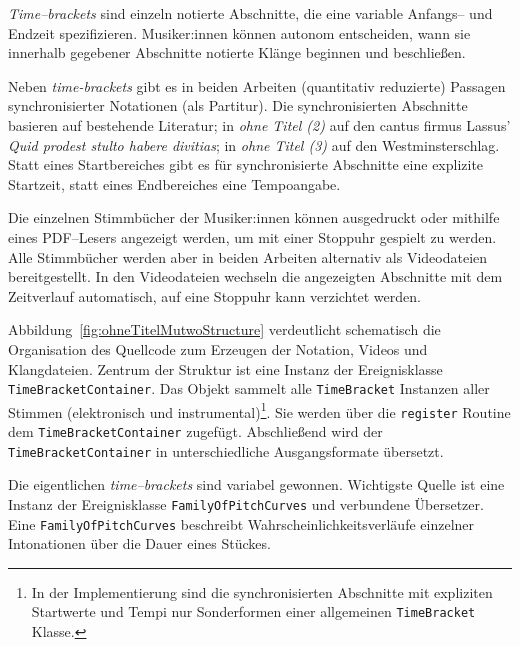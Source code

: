 \documentclass[12pt,a4paper,ngerman]{article}
\begin{document}
\emph{Time--brackets} sind einzeln notierte Abschnitte, die eine variable Anfangs-- und Endzeit spezifizieren.
Musiker:innen können autonom entscheiden, wann sie innerhalb gegebener Abschnitte notierte Klänge beginnen und beschließen.


\bigskip

Neben \emph{time-brackets} gibt es in beiden Arbeiten (quantitativ reduzierte) Passagen synchronisierter Notationen (als Partitur).
Die synchronisierten Abschnitte basieren auf bestehende Literatur; in \emph{ohne Titel (2)} auf den cantus firmus Lassus' \emph{Quid prodest stulto habere divitias}; in \emph{ohne Titel (3)} auf den Westminsterschlag.
Statt eines Startbereiches gibt es für synchronisierte Abschnitte eine explizite Startzeit, statt eines Endbereiches eine Tempoangabe.

\bigskip

Die einzelnen Stimmbücher der Musiker:innen können ausgedruckt oder mithilfe eines PDF--Lesers angezeigt werden, um mit einer Stoppuhr gespielt zu werden.
Alle Stimmbücher werden aber in beiden Arbeiten alternativ als Videodateien bereitgestellt.
In den Videodateien wechseln die angezeigten Abschnitte mit dem Zeitverlauf automatisch, auf eine Stoppuhr kann verzichtet werden.

\bigskip

Abbildung~\ref{fig:ohneTitelMutwoStructure} verdeutlicht schematisch die Organisation des Quellcode zum Erzeugen der Notation, Videos und Klangdateien.
Zentrum der Struktur ist eine Instanz der Ereignisklasse \texttt{TimeBracketContainer}.
Das Objekt sammelt alle \texttt{TimeBracket} Instanzen aller Stimmen (elektronisch und instrumental)\footnote{%
    In der Implementierung sind die synchronisierten Abschnitte mit expliziten Startwerte und Tempi nur Sonderformen einer allgemeinen \texttt{TimeBracket} Klasse.
}.
Sie werden über die \texttt{register} Routine dem \texttt{TimeBracketContainer} zugefügt.
Abschließend wird der \texttt{TimeBracketContainer} in unterschiedliche Ausgangsformate übersetzt.

\bigskip

Die eigentlichen \emph{time--brackets} sind variabel gewonnen.
Wichtigste Quelle ist eine Instanz der Ereignisklasse \texttt{FamilyOfPitchCurves} und verbundene Übersetzer.
Eine \texttt{FamilyOfPitchCurves} beschreibt Wahrscheinlichkeitsverläufe einzelner Intonationen über die Dauer eines Stückes.
\end{document}
